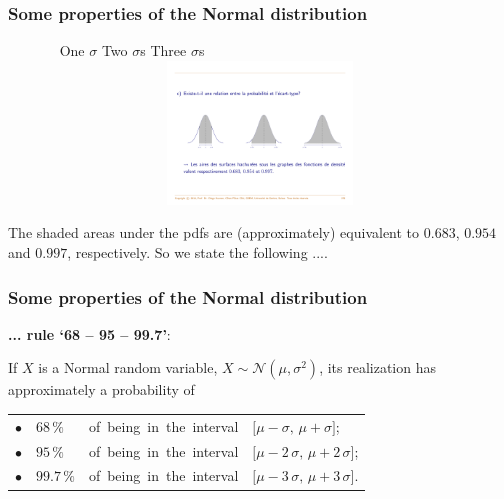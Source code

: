 \documentclass[notes=show,smaller,handout]{beamer}
\newcommand{\N}{\mathcal{N}}
\begin{document}
\begin{frame}%

\frametitle{Some properties of the Normal distribution}


\begin{figure}[ptb]\centering
\ \hspace{0.6cm} One $\sigma$ \hspace{2.4cm} Two $\sigma$s \hspace{2.5cm} Three $\sigma$s \hspace{3cm}
\includegraphics[height=1.5in, width=4.5in]{Areas_Normal.pdf}%
\end{figure}%
The shaded areas under the pdfs are (approximately) equivalent to $0.683$, $0.954$ and $0.997$, 
respectively. So we state  the following ....

\end{frame}%



\begin{frame}%

\frametitle{Some properties of the Normal distribution}




\textbf{... rule `68 -- 95 -- 99.7'}: \\ \vspace{0.5cm}


If $X$ is a Normal random variable, $X \sim \N(\mu, \sigma^2)$, its realization has approximately a probability of \\ \vspace{0.5cm}

\begin{tabular}{llll}
$\bullet$
&
$68 \, \%$ 
&
\mbox{of being in the interval}
&
$\lbrack \mu - \sigma, \, \mu + \sigma \rbrack$;\\[0.2cm]
$\bullet$
&
$95 \, \%$  
&
\mbox{of being in the interval}
&
$\lbrack \mu - 2 \, \sigma, \, \mu + 2 \, \sigma \rbrack$;\\[0.2cm]
$\bullet$
&
$99.7 \, \%$  
&
\mbox{of being in the interval}&
$\lbrack \mu - 3 \, \sigma, \, \mu + 3 \, \sigma \rbrack$.\\[0.2cm]
\end{tabular}
\end{frame}
\end{document}
